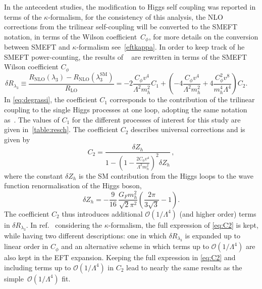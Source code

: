 	\par In the antecedent studies, the modification to Higgs self coupling was reported in terms of the $\kappa$-formalism, for the consistency of this analysis, the NLO corrections from the trilinear self-coupling will be converted to the SMEFT notation, in terms of the Wilson coefficient~$C_\phi$, for more details on the conversion between SMEFT and $\kappa$-formalism see~\autoref{eftkappa}. In order to keep track of he SMEFT power-counting, the results of ~\cite{Degrassi:2016wml} are rewritten in terms of the SMEFT Wilson coefficient $C_\phi$
	\begin{equation}
		\delta R_{\lambda_3}\equiv\frac{R_\mathrm{ NLO}(\lambda_3)-R_\mathrm{ NLO}(\lambda_3^\mathrm{{SM}})}{R_\mathrm{ LO}}=-2\frac{C_{\phi}v^4}{\Lambda^2 m_h^2}C_1 + \left(-4\frac{C_{\phi}v^4}{\Lambda^2 m_h^2}+4\frac{C_{\phi}^2 v^8}{m_h^4\Lambda^4}\right) C_2 . \;\;\;\;\;
		\label{eq:degrassi}
	\end{equation}
	In \eqref{eq:degrassi}, the coefficient $C_1$ corresponds to the contribution of the trilinear coupling to the single Higgs processes at one loop, adopting the same notation as~\cite{Degrassi:2016wml}. The values of $C_1$ for the different processes of interest for this study are given in~\autoref{table:resch}. The coefficient $C_2$ describes universal corrections and is given by
	\begin{equation}
		C_2=\frac{\delta Z_h}{1-\left(1-\frac{2 C_\phi v^4}{\Lambda^2 m_h^2}\right)^2 \delta Z_h}\,, \label{eq:C2}
	\end{equation}
	where the constant $\delta Z_h$ is the SM contribution from the Higgs loops to the wave function renormalisation of the Higgs boson,
	\begin{equation}
		\delta Z_h =-\frac{9}{16}\,\frac{G_F m_h^2}{\sqrt{2}\pi^2}\left(\frac{2\pi}{3\sqrt{3}}-1\right).
	\end{equation}
	The coefficient $C_2$ thus introduces additional $\mathcal{O}(1/\Lambda^4)$ (and higher order) terms in $\delta R_{\lambda_3}$.  
	In ref.~\cite{Degrassi:2016wml} considering the $\kappa$-formalism, the full expression of \eqref{eq:C2} is kept, while having two different descriptions: one in which $\delta R_{\lambda_3}$ is expanded up to linear order in $C_\phi$ and an alternative scheme in which terms up to $\mathcal{O}(1/\Lambda^4)$ are also kept in the EFT expansion. Keeping the full expression in \eqref{eq:C2} and including terms up to $\mathcal{O}(1/\Lambda^4)$  in $C_2$ lead to nearly the same results as the simple~$\mathcal{O}(1/\Lambda^4)$ fit.
